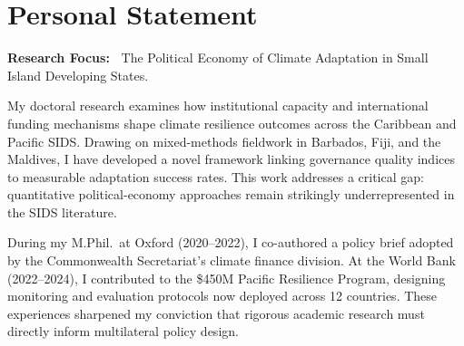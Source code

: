 \section{Personal Statement}

{\color{accent}\bfseries Research Focus:\ }
The Political Economy of Climate Adaptation in Small Island Developing States.

My doctoral research examines how institutional capacity and international funding
mechanisms shape climate resilience outcomes across the Caribbean and Pacific SIDS.
Drawing on mixed-methods fieldwork in Barbados, Fiji, and the Maldives, I have developed
a novel framework linking governance quality indices to measurable adaptation success
rates. This work addresses a critical gap: quantitative political-economy approaches
remain strikingly underrepresented in the SIDS literature.

During my M.Phil.\ at Oxford (2020--2022), I co-authored a policy brief adopted by the
Commonwealth Secretariat's climate finance division. At the World Bank (2022--2024), I
contributed to the \$450M Pacific Resilience Program, designing monitoring and evaluation
protocols now deployed across 12 countries. These experiences sharpened my conviction
that rigorous academic research must directly inform multilateral policy design.
